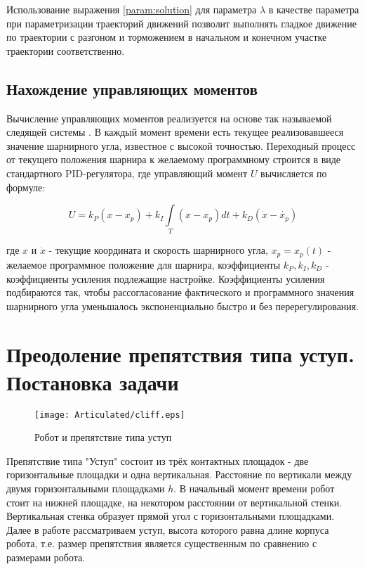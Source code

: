 Использование выражения \ref{param:solution} для параметра $\lambda$ в качестве параметра при параметризации траекторий движений позволит выполнять гладкое движение по траектории с разгоном и торможением в начальном и конечном участке траектории соответственно.


\subsection{Нахождение управляющих моментов}
\label{control_torques}
Вычисление управляющих моментов реализуется на основе так называемой следящей системы . В каждый момент времени есть текущее реализовавшееся значение шарнирного угла, известное с высокой точностью. Переходный процесс от текущего положения шарнира к желаемому программному строится в виде стандартного PID-регулятора, где управляющий момент $U$ вычисляется по формуле:

\begin{equation}
  U = k_P (x - x_p) + k_I\int\limits_T (x - x_p)dt + k_D(\dot{x} - \dot{x_p})
\end{equation}

где $x$ и $\dot{x}$ - текущие координата и скорость шарнирного угла, $x_p = x_p(t)$ - желаемое программное положение для шарнира, коэффициенты $k_P, k_I, k_D$ - коэффициенты усиления подлежащие настройке. Коэффициенты усиления подбираются так, чтобы рассогласование фактического и программного значения шарнирного угла уменьшалось экспоненциально быстро и без перерегулирования.

\section{Преодоление препятствия типа уступ. Постановка задачи}

\begin{figure}[ht]
  \centering
  \texttt{[image: Articulated/cliff.eps]}
  \caption{Робот и препятствие типа уступ}
  \label{articulated:fig:cliff}
\end{figure}

Препятствие типа "Уступ" состоит из трёх контактных площадок - две горизонтальные площадки и одна вертикальная. Расстояние по вертикали между двумя горизонтальными площадками $h$. В начальный момент времени робот стоит на нижней площадке, на некотором расстоянии от вертикальной стенки. Вертикальная стенка образует прямой угол с горизонтальными площадками. Далее в работе рассматриваем уступ, высота которого равна длине корпуса робота, т.е. размер препятствия является существенным по сравнению с размерами робота.

